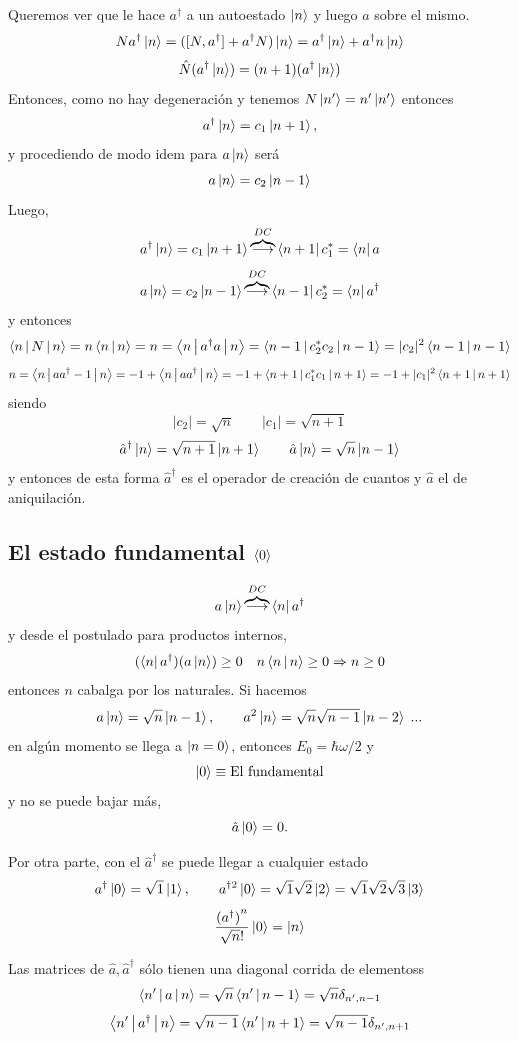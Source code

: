 \documentclass[10pt,oneside]{CBFT_book}
\begin{document}
Queremos ver que le  hace $a^\dagger$  a un autoestado $\Ket{n}$ y luego $a$ sobre el mismo.
\[
	N a^\dagger \Ket{n} = ([N, a^\dagger] + a^\dagger N) \Ket{n} =
	a^\dagger \Ket{n} + a^\dagger n \Ket{n} 
\]
\[
	\Hat{N} (a^\dagger\Ket{n}) = (n+1)(a^\dagger\Ket{n})
\]
Entonces, como no hay degeneración y tenemos $N\Ket{n'} = n'\Ket{n'}$ entonces 
\[
	a^\dagger \Ket{n} = c_1 \Ket{n+1},
\]
y procediendo de modo idem para $a\ket{n}$ será
\[
	a \Ket{n} = c_2 \Ket{n-1}
\]
Luego,
\[
	a^\dagger \Ket{n} = c_1 \Ket{n+1} \overbrace{\longrightarrow}^{DC} 
	\Bra{n+1} c_1^* = \Bra{n} a 
\]
\[
	a \Ket{n} = c_2 \Ket{n-1} \overbrace{\longrightarrow}^{DC} \Bra{n-1} c_2^* = \Bra{n} a^\dagger
\]
y entonces 
\[
	\Braket{n|N|n} = n \Braket{n|n} = n =  \Braket{n| a^\dagger a |n} =  \Braket{n-1|c_2^* c_2|n-1} =
	|c_2|^2 \Braket{n-1|n-1}
\]
\[
	n = \Braket{n|aa^\dagger-1|n} = -1 + \Braket{n|aa^\dagger|n} = - 1 + \Braket{n+1|c_1^*c_1|n+1} =
	-1 + |c_1|^2 \Braket{n+1|n+1}
\]
siendo
\[
	|c_2| = \sqrt{n} \qquad |c_1| = \sqrt{n+1} 
\]
\[
	\hat{a}^\dagger \Ket{n} = \sqrt{n+1} \Ket{n+1} \qquad  \hat{a}\Ket{n} = \sqrt{n} \Ket{n-1} 
\]
y entonces de esta forma $\hat{a}^\dagger$ es el operador de creación de cuantos y $\hat{a}$ el de aniquilación.

\subsection{El estado fundamental $\Braket{0}$}

\[
	a \Ket{n}  \overbrace{\longrightarrow}^{DC} \Bra{n} a^\dagger
\]
y desde el postulado para productos internos,
\[
	(\Bra{n}a^\dagger)(a\Ket{n}) \geq 0 \quad n \Braket{n|n} \geq 0 \Rightarrow n \geq 0 
\]
entonces $n$ cabalga por los naturales.
Si hacemos 
\[
	a\Ket{n} = \sqrt{n} \Ket{n-1}, \qquad  a^2 \Ket{n} = \sqrt{n}\sqrt{n-1} \Ket{n-2} \; ...
\]
en algún momento se llega a $\Ket{n=0}$, entonces $E_0 = \hbar\omega/2$ y 
\[
	\Ket{0} \equiv \text{El fundamental}
\]
y no se puede bajar más,
\[
	\hat{a}\Ket{0} = 0.
\]

Por otra parte, con el $\hat{a}^\dagger$ se puede llegar a cualquier estado
\[
	a^\dagger \Ket{0} = \sqrt{1} \Ket{1}, \qquad  a^{\dagger 2} \Ket{0} = \sqrt{1}\sqrt{2} \Ket{2} = 
	\sqrt{1}\sqrt{2}\sqrt{3} \Ket{3}
\]
\[
	\frac{{(a^{\dagger})}^n}{\sqrt{n}!} \Ket{0} = \Ket{n}
\]

Las matrices de $\hat{a},\hat{a}^\dagger$ sólo tienen una diagonal corrida de elementoss 
\[
	\Braket{n'|a|n} = \sqrt{n} \Braket{n'|n-1} = \sqrt{n} \delta_{n',n-1}
\]
\[
	\Braket{n'|a^\dagger|n} =  \sqrt{n-1} \Braket{n'|n+1} = \sqrt{n-1} \delta_{n',n+1}
\]
\end{document}
